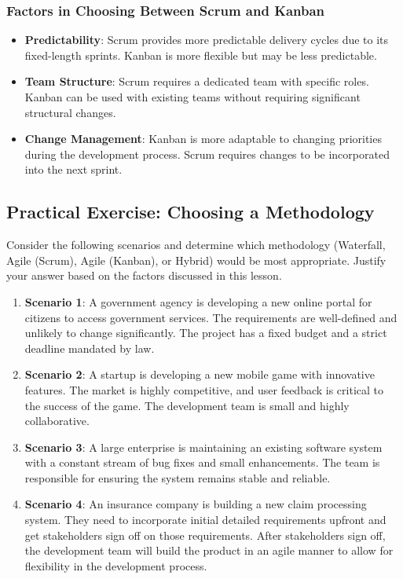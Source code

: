 \subsubsection{Factors in Choosing Between Scrum and Kanban}

\begin{itemize}
  \item \textbf{Predictability}: Scrum provides more predictable delivery cycles due to its fixed-length sprints. Kanban is more flexible but may be less predictable.
  \item \textbf{Team Structure}: Scrum requires a dedicated team with specific roles. Kanban can be used with existing teams without requiring significant structural changes.
  \item \textbf{Change Management}: Kanban is more adaptable to changing priorities during the development process. Scrum requires changes to be incorporated into the next sprint.
\end{itemize}

\subsection{Practical Exercise: Choosing a Methodology}

Consider the following scenarios and determine which methodology (Waterfall,
Agile (Scrum), Agile (Kanban), or Hybrid) would be most appropriate. Justify
your answer based on the factors discussed in this lesson.

\begin{enumerate}
  \item \textbf{Scenario 1}: A government agency is developing a new online portal for citizens to access government services. The requirements are well-defined and unlikely to change significantly. The project has a fixed budget and a strict deadline mandated by law.

  \item \textbf{Scenario 2}: A startup is developing a new mobile game with innovative features. The market is highly competitive, and user feedback is critical to the success of the game. The development team is small and highly collaborative.

  \item \textbf{Scenario 3}: A large enterprise is maintaining an existing software system with a constant stream of bug fixes and small enhancements. The team is responsible for ensuring the system remains stable and reliable.

  \item \textbf{Scenario 4}: An insurance company is building a new claim processing system. They need to incorporate initial detailed requirements upfront and get stakeholders sign off on those requirements. After stakeholders sign off, the development team will build the product in an agile manner to allow for flexibility in the development process.
\end{enumerate}

